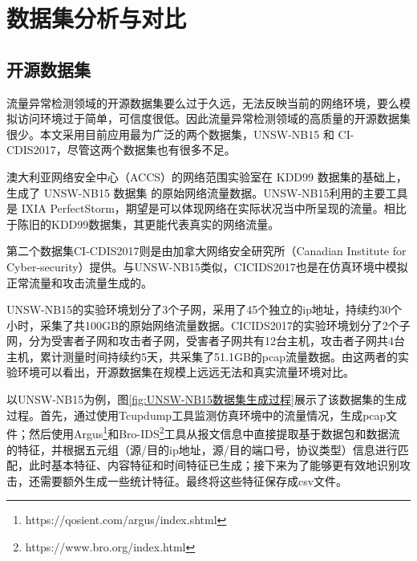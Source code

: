 
\chapter{数据集分析与对比}
\section{开源数据集}
流量异常检测领域的开源数据集要么过于久远，无法反映当前的网络环境，要么模拟访问环境过于简单，可信度很低。因此流量异常检测领域的高质量的开源数据集很少。本文采用目前应用最为广泛的两个数据集，UNSW-NB15 和 CI-
CDIS2017，尽管这两个数据集也有很多不足。

澳大利亚网络安全中心（ACCS）的网络范围实验室在 KDD99 数据集的基础上，生成了 UNSW-NB15 数据集\cite{moustafa2015unsw} 的原始网络流量数据。UNSW-NB15利用的主要工具是 IXIA PerfectStorm，期望是可以体现网络在实际状况当中所呈现的流量。相比于陈旧的KDD99数据集\cite{ozgur2016review}，其更能代表真实的网络流量。

第二个数据集CI-CDIS2017则是由加拿大网络安全研究所（Canadian Institute for Cyber-security）提供。与UNSW-NB15类似，CICIDS2017也是在仿真环境中模拟正常流量和攻击流量生成的。

UNSW-NB15的实验环境划分了3个子网，采用了45个独立的ip地址，持续约30个小时，采集了共100GB的原始网络流量数据。CICIDS2017的实验环境划分了2个子网，分为受害者子网和攻击者子网，受害者子网共有12台主机，攻击者子网共4台主机，累计测量时间持续约5天，共采集了51.1GB的pcap流量数据。由这两者的实验环境可以看出，开源数据集在规模上远远无法和真实流量环境对比。




以UNSW-NB15为例，图\ref{fig:UNSW-NB15数据集生成过程}展示了该数据集的生成过程。首先，通过使用Tcupdump工具监测仿真环境中的流量情况，生成pcap文件；然后使用Argus\footnote{https://qosient.com/argus/index.shtml}和Bro-IDS\footnote{https://www.bro.org/index.html}工具从报文信息中直接提取基于数据包和数据流的特征，并根据五元组（源/目的ip地址，源/目的端口号，协议类型）信息进行匹配，此时基本特征、内容特征和时间特征已生成；接下来为了能够更有效地识别攻击，还需要额外生成一些统计特征。最终将这些特征保存成csv文件。



